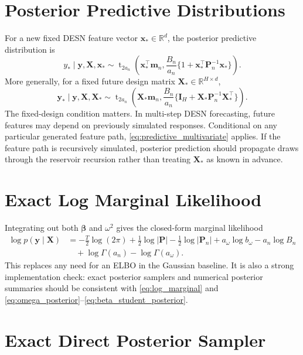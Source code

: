 \documentclass[11pt]{article}
\newcommand{\R}{\mathbb{R}}
\newcommand{\vect}[1]{\bm{#1}}
\newcommand{\mat}[1]{\bm{#1}}
\newcommand{\StudentT}{\operatorname{t}}
\begin{document}
\section{Posterior Predictive Distributions}
\label{sec:predictive}

For a new fixed DESN feature vector \(\vect x_*\in\R^d\), the posterior
predictive distribution is
\begin{equation}
\label{eq:predictive_univariate}
y_*\mid\vect y,\mat X,\vect x_*
\sim
\StudentT_{2a_n}\left(
\vect x_*^\top\vect m_n,
\frac{B_n}{a_n}\{1+\vect x_*^\top\mat P_n^{-1}\vect x_*\}
\right).
\end{equation}
More generally, for a fixed future design matrix \(\mat X_*\in\R^{H\times d}\),
\begin{equation}
\label{eq:predictive_multivariate}
\vect y_*\mid\vect y,\mat X,\mat X_*
\sim
\StudentT_{2a_n}\left(
\mat X_*\vect m_n,
\frac{B_n}{a_n}\{\mat I_H+\mat X_*\mat P_n^{-1}\mat X_*^\top\}
\right).
\end{equation}
The fixed-design condition matters. In multi-step DESN forecasting, future
features may depend on previously simulated responses. Conditional on any
particular generated feature path, \eqref{eq:predictive_multivariate} applies.
If the feature path is recursively simulated, posterior prediction should
propagate draws through the reservoir recursion rather than treating
\(\mat X_*\) as known in advance.

\section{Exact Log Marginal Likelihood}
\label{sec:log_marginal}

Integrating out both \(\vect\beta\) and \(\omega^2\) gives the closed-form
marginal likelihood
\begin{align}
\label{eq:log_marginal}
\log p(\vect y\mid\mat X)
&=-\frac{T}{2}\log(2\pi)
+\frac12\log|\mat P|-\frac12\log|\mat P_n|
+a_\omega\log b_\omega-a_n\log B_n
\nonumber\\
&\quad+\log\Gamma(a_n)-\log\Gamma(a_\omega).
\end{align}
This replaces any need for an ELBO in the Gaussian baseline. It is also a
strong implementation check: exact posterior samplers and numerical posterior
summaries should be consistent with \eqref{eq:log_marginal} and
\eqref{eq:omega_posterior}--\eqref{eq:beta_student_posterior}.

\section{Exact Direct Posterior Sampler}
\label{sec:direct_sampler}
\end{document}
